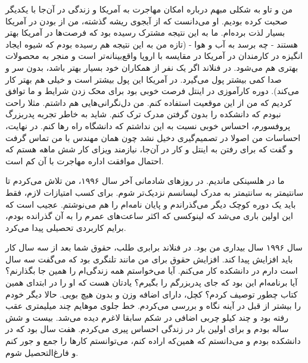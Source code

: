 من و تاو به شکلی مبهم درباره امکان مهاجرت به آمریکا و زندگی در آن‌جا با
یکدیگر صحبت کرده بودیم. او می‌دانست که از آبجوی ریشه گذشته، من از بودن
در آمریکا بسیار لذت برد‌ه‌ام. ما به این نتیجه مشترک رسیده بود که فرصت‌ها
در آمریکا بهتر هستند - چه برسد به آب و هوا - (تازه من به این نتیجه هم
رسیده بودم که شیوه ایجاد انگیزه در کارمندان در آمریکا در مقایسه با
اروپا واقع‌بینانه‌تر است و منجر به محصولات بهتری هم می‌شود. در فنلاند اگر
یک نفر از همکاران خود بسیار بهتر باشد، بدون سر و صدا کمی بیشتر پول
می‌گیرد. در آمریکا این پول بیشتر است و خیلی هم بهتر کار می‌کند). دوره
کارآموزی در اینتل فرصت خوبی بود برای محک زدن شرایط و ما توافق کردیم که
من از این موقعیت استفاده کنم. من دل‌نگرانی‌هایی هم داشتم. مثلا راحت
نبودم که دانشکده را بدون گرفتن مدرک ترک کنم. شاید به خاطر تجربه
پدربزرگ پروفسورم، احساس خوبی نسبت به این نداشتم که دانشگاه راه رها
کنم. در نهایت، احساسات من اصولا در تصمیم‌گیری دخیل نشد چون همان مهندس
با من تماس گرفت و گفت که برای رفتن به اینتل و کار در آن‌جا، نیازمند
ویزای کار شش ماهه هستم که احتمال موافقت اداره مهاجرت با آن کم است.

ما در هلسینکی ماندیم. در روزهای شادمانی آخر سال ۱۹۹۶، من تلاش می‌کردم
تا سانتیمتر به سانتیمتر به مدرک لیسانسم نزدیک‌تر شوم. برای کسب امتیازات
لازم، فقط باید یک دوره کوچک دیگر می‌گذراندم و پایان نامه‌ام را هم
می‌نوشتم. عجیب است که این اولین باری می‌شد که لینوکسی که اکثر ساعت‌های
عمرم را به آن گذرانده بودم، برایم کاربردی تحصیلی پیدا می‌کرد.

سال ۱۹۹۶ سال بیداری من بود. در فنلاند برابری طلب، حقوق شما بعد از سه
سال کار باید افزایش پیدا کند. افزایش حقوق برای من مانند تلنگری بود که
می‌گفت سه سال است دارم در دانشکده کار می‌کنم. آیا می‌خواستم همه زندگی‌ام
را همین جا بگذارنم؟ آیا برنامه‌ام این بود که جای پدربزرگم را بگیرم؟
یادتان هست که او را در ابتدای همین کتاب چطور توصیف کردم؟ کچل، دارای
اضافه وزن و بدون هیچ بویی. حالا دیگر خودم را بیشتر از قبل در آینه نگاه
و بررسی می‌کردم. خط جلوی موهایم چند میلیمتری عقب رفته بود و چند کیلو
چربی اضافی در شکم سابقا لاغرم دیده می‌شد. بیست و شش ساله بودم و برای
اولین بار در زندگی احساس پیری می‌کردم. هفت سال بود که در دانشکده بودم و
می‌دانستم که همین‌که اراده کنم، می‌توانستم کارها را جمع و جور کنم و
فارغ‌التحصیل شوم.

